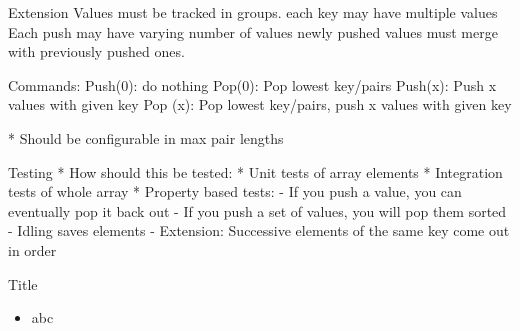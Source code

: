 \begin{frame}[fragile]{Extension}
	Values must be tracked in groups. 
	each key may have multiple values
	Each push may have varying number of values
	newly pushed values must merge with previously pushed ones.
	
	Commands:
		Push(0): do nothing
		Pop(0): Pop lowest key/pairs
		Push(x): Push x values with given key
		Pop (x): Pop lowest key/pairs, push x values with given key
	
	* Should be configurable in max pair lengths
\end{frame}

\begin{frame}[fragile]{Testing}
	* How should this be tested:
	* Unit tests of array elements
	* Integration tests of whole array
	* Property based tests:
		- If you push a value, you can eventually pop it back out
		- If you push a set of values, you will pop them sorted
		- Idling saves elements
		- Extension: Successive elements of the same key come out in order
\end{frame}



\begin{frame}[fragile]{Title}
\begin{itemize}
\item abc
\end{itemize}
\end{frame}
